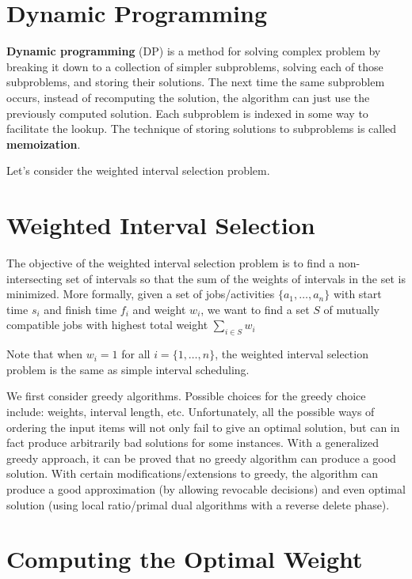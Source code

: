 \section{Dynamic Programming}  

\textbf{Dynamic programming} (DP) is a method for solving complex problem by breaking it down to a collection of simpler subproblems, solving each of those subproblems, and storing their solutions. The next time the same subproblem occurs, instead of recomputing the solution, the algorithm can just use the previously computed solution. Each subproblem is indexed in some way to facilitate the lookup. The technique of storing solutions to subproblems is called \textbf{memoization}.

Let's consider the weighted interval selection problem.

\section{Weighted Interval Selection}

The objective of the weighted interval selection problem is to find a non-intersecting set of intervals so that the sum of the weights of intervals in the set is minimized. More formally, given a set of jobs/activities $\{a_1,\ldots,a_n\}$ with start time $s_i$ and finish time $f_i$ and weight $w_i$, we want to find a set $S$ of mutually compatible jobs with highest total weight $\sum_{i \in S} w_i$ 

Note that when $w_i = 1$ for all $i = \{1,\ldots,n\}$, the weighted interval selection problem is the same as simple interval scheduling.

We first consider greedy algorithms. Possible choices for the greedy choice include: weights, interval length, etc. Unfortunately, all the possible ways of ordering the input items will not only fail to give an optimal solution, but can in fact produce arbitrarily bad solutions for some instances. With a generalized greedy approach, it can be proved that no greedy algorithm can produce a good solution. With certain modifications/extensions to greedy, the algorithm can produce a good approximation (by allowing revocable decisions) and even optimal solution (using local ratio/primal dual algorithms with a reverse delete phase).

\section{Computing the Optimal Weight}
